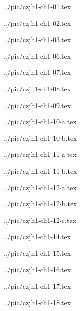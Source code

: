 

../pic/czjh1-ch1-01.tex



../pic/czjh1-ch1-02.tex



../pic/czjh1-ch1-03.tex



../pic/czjh1-ch1-06.tex



../pic/czjh1-ch1-07.tex



../pic/czjh1-ch1-08.tex



../pic/czjh1-ch1-09.tex



../pic/czjh1-ch1-10-a.tex



../pic/czjh1-ch1-10-b.tex



../pic/czjh1-ch1-11-a.tex



../pic/czjh1-ch1-11-b.tex



../pic/czjh1-ch1-12-a.tex



../pic/czjh1-ch1-12-b.tex



../pic/czjh1-ch1-12-c.tex



../pic/czjh1-ch1-14.tex



../pic/czjh1-ch1-15.tex



../pic/czjh1-ch1-16.tex



../pic/czjh1-ch1-17.tex



../pic/czjh1-ch1-18.tex

